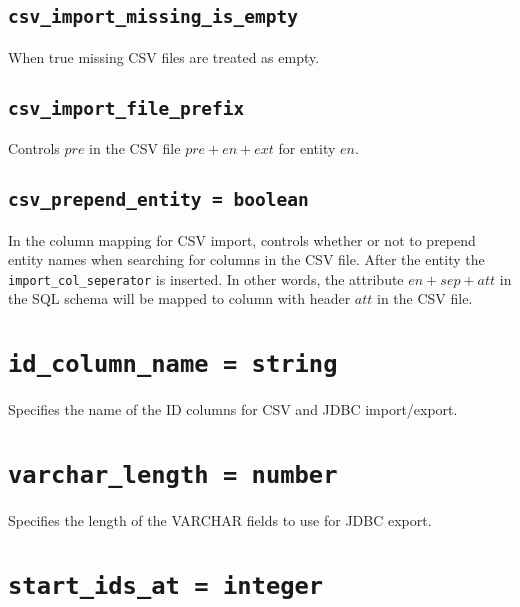 \documentclass[10pt]{book}
\begin{document}
\subsection{{\tt csv\_import\_missing\_is\_empty}}

When true missing CSV files are treated as empty.

\subsection{{\tt csv\_import\_file\_prefix}}

Controls $pre$ in the CSV file $pre + en + ext$ for entity $en$.

\subsection{{\tt csv\_prepend\_entity = boolean}}

In the column mapping for CSV import, controls whether or not to prepend entity names when searching for columns in the CSV file.   After the entity the {\tt import\_col\_seperator} is inserted.  In other words, the attribute $en + sep + att$ in the SQL schema will be mapped to column with header $att$ in the CSV file.

%

%
%
%
\section{{\tt id\_column\_name = string}}
Specifies the name of the ID columns for CSV and JDBC import/export.

\section{{\tt varchar\_length = number}}
Specifies the length of the VARCHAR fields to use for JDBC export.

\section{ {\tt start\_ids\_at = integer}}
\end{document}
